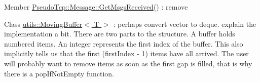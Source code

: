 \label{todo__todo000001}
\hypertarget{todo__todo000001}{}
 
\begin{DoxyDescription}
\item[Member \hyperlink{group__group1_gaa74cf86697d336a90508f375067e02ef}{PseudoTcp::Message::GetMsgsReceived}() ]: remove 
\end{DoxyDescription}

\label{todo__todo000002}
\hypertarget{todo__todo000002}{}
 
\begin{DoxyDescription}
\item[Class \hyperlink{classutils_1_1MovingBuffer}{utils::MovingBuffer$<$ T $>$} ]: perhaps convert vector to deque. explain the implementation a bit. There are two parts to the structure. A buffer holds numbered items. An integer represents the first index of the buffer. This also implicitly tells us that the first (firstIndex -\/ 1) items have all arrived. The user will probably want to remove items as soon as the first gap is filled, that is why there is a popIfNotEmpty function. 
\end{DoxyDescription}